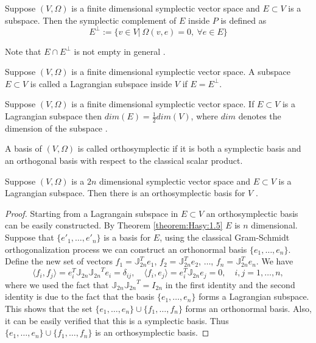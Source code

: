 {\edit 
\begin{definition}
Suppose $(V,\Omega)$ is a finite dimensional symplectic vector space and $E\subset V$ is a subspace. Then the symplectic complement of $E$ inside $P$ is defined as
\[
	E^{\perp} := \{ v\in V |\ \Omega(v,e) = 0,\ \forall e\in E \}
\]
\end{definition}
Note that $E \cap E^{\perp}$ is not empty in general \cite{de2006symplectic}. 
\begin{definition}
Suppose $(V,\Omega)$ is a finite dimensional symplectic vector space. A subspace $E\subset V$ is called a Lagrangian subspace inside $V$ if $E = E^\perp$.
\end{definition}
\begin{theorem} \label{theorem:Hasy:1.5}
Suppose $(V,\Omega)$ is a finite dimensional symplectic vector space. If $E\subset V$ is a Lagrangian subspace then $dim(E)=\frac 1 2dim(V)$, where $dim$ denotes the dimension of the subspace \cite{abraham1978foundations}.
\end{theorem}
\begin{definition}
A basis of $(V,\Omega)$ is called orthosymplectic if it is both a symplectic basis and an orthogonal basis with respect to the classical scalar product.
\end{definition}
\begin{theorem} \label{theorem:Hasy:1.6}
Suppose $(V,\Omega)$ is a $2n$ dimensional symplectic vector space and $E\subset V$ is a Lagrangian subspace. Then there is an orthosymplectic basis for $V$ \cite{da2003introduction}.
\end{theorem}
\begin{proof}
Starting from a Lagrangain subspace in $E \subset V$ an orthosymplectic basis can be easily constructed. By Theorem \ref{theorem:Hasy:1.5} $E$ is $n$ dimensional. Suppose that $\{ e'_1,\dots, e'_n \}$ is a basis for $E$, using the classical Gram-Schmidt orthogonalization process we can construct an orthonormal basis $\{ e_1,\dots,e_n \}$. Define the new set of vectors $f_1 = \mathbb J_{2n}^Te_1$, $f_2 =\mathbb J_{2n}^T e_2$, $\dots$, $f_n= \mathbb J_{2n}^Te_n$. We have
\begin{equation}
	\langle f_i, f_j \rangle = e_i^T \mathbb J_{2n} {\mathbb J_{2n}}^T e_i = \delta_{ij}, \quad \langle f_i, e_j \rangle = e_i^T \mathbb J_{2n} e_j = 0, \quad i,j=1,\dots,n,
\end{equation}
where we used the fact that $\mathbb J_{2n} {\mathbb J_{2n}}^T = I_{2n}$ in the first identity and the second identity is due to the fact that the basis $\{ e_1,\dots,e_n \}$ forms a Lagrangian subspace. This shows that the set $\{ e_1,\dots,e_n \}\cup \{ f_1,\dots,f_n \}$ forms an orthonormal basis. Also, it can be easily verified that this is a symplectic basis. Thus $\{ e_1,\dots,e_n \}\cup \{ f_1,\dots,f_n \}$ is an orthosymplectic basis.

\end{proof}}
